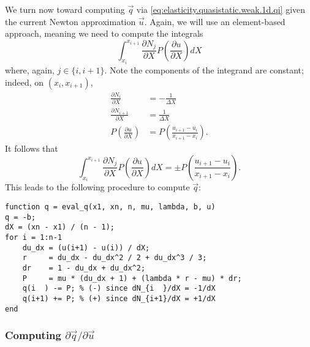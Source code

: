 We turn now toward computing $\vec{q}$ via \eqref{eq:elasticity.quasistatic.weak.1d.qi} given the current Newton approximation $\vec{u}$. Again, we will use an element-based approach, meaning we need to compute the integrals
\begin{equation*}
\int_{x_i}^{x_{i+1}} \frac{\partial N_j}{\partial X} P \left( \frac{\partial u}{\partial X} \right) dX
\end{equation*}
where, again, $j \in \{i, i+1\}$. Note the components of the integrand are constant; indeed, on $\left( x_i, x_{i+1} \right)$,
\begin{align*}
\frac{\partial N_i}{\partial X} & = -\frac{1}{\Delta X} \\
\frac{\partial N_{i+1}}{\partial X} & = \frac{1}{\Delta X} \\
P \left( \frac{\partial u}{\partial X} \right) & = P \left( \frac{u_{i+1} - u_i}{x_{i+1} - x_i} \right).
\end{align*}
It follows that
\begin{equation*}
\int_{x_i}^{x_{i+1}} \frac{\partial N_j}{\partial X} P \left( \frac{\partial u}{\partial X} \right) dX = \pm P \left( \frac{u_{i+1} - u_i}{x_{i+1} - x_i} \right).
\end{equation*}
This leads to the following procedure to compute $\vec{q}$:
\begin{verbatim}
function q = eval_q(x1, xn, n, mu, lambda, b, u)
q = -b;
dX = (xn - x1) / (n - 1);
for i = 1:n-1
    du_dx = (u(i+1) - u(i)) / dX;
    r     = du_dx - du_dx^2 / 2 + du_dx^3 / 3;
    dr    = 1 - du_dx + du_dx^2;
    P     = mu * (du_dx + 1) + (lambda * r - mu) * dr;
    q(i  ) -= P; % (-) since dN_{i  }/dX = -1/dX
    q(i+1) += P; % (+) since dN_{i+1}/dX = +1/dX
end
\end{verbatim}

\vspace{.5\baselineskip}
\subsubsection{Computing $\partial\vec{q}/\partial\vec{u}$}

